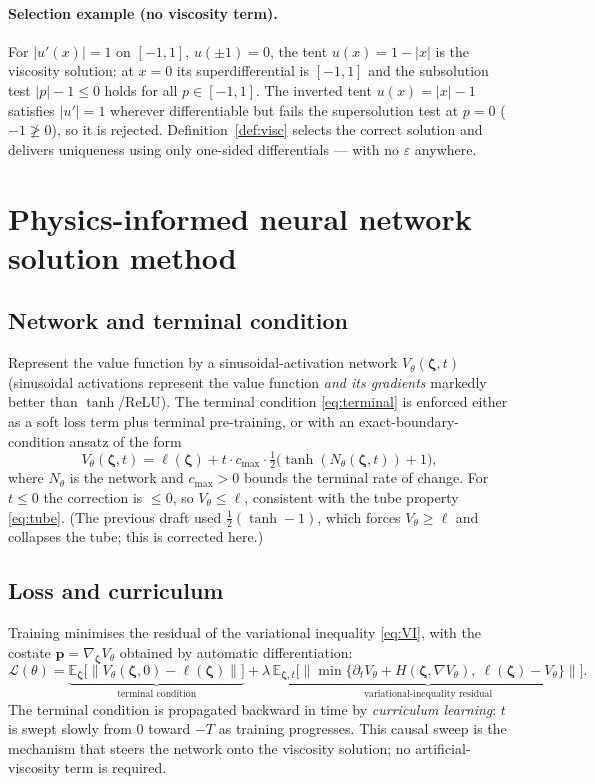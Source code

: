 \documentclass[11pt]{article}
\newcommand{\zbf}{\bm{\zeta}}
\newcommand{\pbf}{\bm{p}}
\begin{document}
\paragraph{Selection example (no viscosity term).} For $|u'(x)|=1$ on $[-1,1]$, $u(\pm1)=0$, the
tent $u(x)=1-|x|$ is the viscosity solution: at $x=0$ its superdifferential is $[-1,1]$ and the
subsolution test $|p|-1\le0$ holds for all $p\in[-1,1]$. The inverted tent $u(x)=|x|-1$ satisfies
$|u'|=1$ wherever differentiable but fails the supersolution test at $p=0$ ($-1\not\ge0$), so it is
rejected. Definition~\ref{def:visc} selects the correct solution and delivers uniqueness using only
one-sided differentials --- with no $\varepsilon$ anywhere.

\section{Physics-informed neural network solution method}

\subsection{Network and terminal condition}

Represent the value function by a sinusoidal-activation network $V_\theta(\zbf,t)$ (sinusoidal
activations represent the value function \emph{and its gradients} markedly better than
$\tanh$/ReLU). The terminal condition \eqref{eq:terminal} is enforced either as a soft loss term
plus terminal pre-training, or with an exact-boundary-condition ansatz of the form
\begin{equation}
V_\theta(\zbf,t)=\ell(\zbf)+t\cdot c_{\max}\cdot\tfrac{1}{2}\big(\tanh(N_\theta(\zbf,t))+1\big),
\end{equation}
where $N_\theta$ is the network and $c_{\max}>0$ bounds the terminal rate of change. For $t\le0$
the correction is $\le0$, so $V_\theta\le\ell$, consistent with the tube property \eqref{eq:tube}.
(The previous draft used $\tfrac12(\tanh-1)$, which forces $V_\theta\ge\ell$ and collapses the tube;
this is corrected here.)

\subsection{Loss and curriculum}

Training minimises the residual of the variational inequality \eqref{eq:VI}, with the costate
$\pbf=\nabla_{\zbf}V_\theta$ obtained by automatic differentiation:
\begin{equation}\label{eq:loss}
\mathcal{L}(\theta)=
\underbrace{\mathbb{E}_{\zbf}\big[\|V_\theta(\zbf,0)-\ell(\zbf)\|\big]}_{\text{terminal condition}}
+\lambda\,
\underbrace{\mathbb{E}_{\zbf,t}\Big[\big\|\min\{\partial_tV_\theta+H(\zbf,\nabla V_\theta),\ \ell(\zbf)-V_\theta\}\big\|\Big]}_{\text{variational-inequality residual}} .
\end{equation}
The terminal condition is propagated backward in time by \emph{curriculum learning}: $t$ is swept
slowly from $0$ toward $-T$ as training progresses. This causal sweep is the mechanism that steers
the network onto the viscosity solution; no artificial-viscosity term is required.
\end{document}
